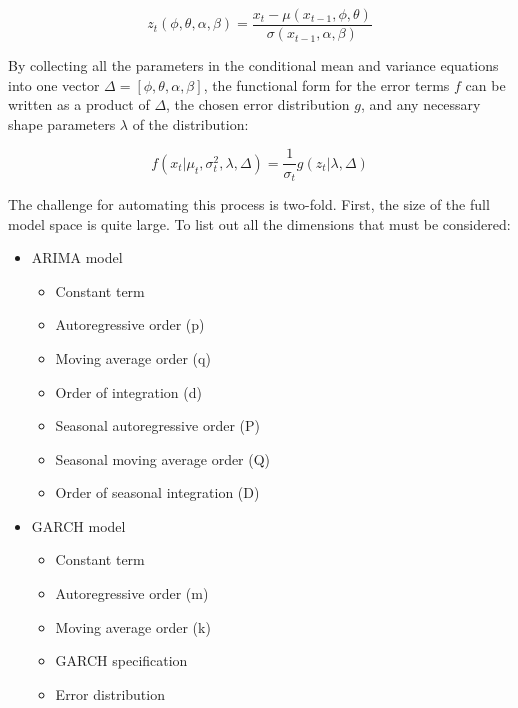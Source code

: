 \documentclass[12pt]{article}
\begin{document}
\begin{equation}
    z_{t}(\phi, \theta, \alpha, \beta) = \frac{x_{t} - \mu(x_{t-1}, \phi, \theta)}{\sigma(x_{t-1}, \alpha, \beta)}
\end{equation}

By collecting all the parameters in the conditional mean and variance equations into one vector $\Delta = [\phi, \theta, \alpha, \beta]$, the functional form for the error terms $f$ can be written as a product of $\Delta$, the chosen error distribution $g$, and any necessary shape parameters $\lambda$ of the distribution:

\begin{equation}
    f(x_{t} | \mu_{t}, \sigma^{2}_{t}, \lambda, \Delta) = \frac{1}{\sigma_{t}} g(z_{t} | \lambda, \Delta)
\end{equation}

The challenge for automating this process is two-fold. First, the size of the full model space is quite large. To list out all the dimensions that must be considered:

\begin{itemize}
    \item ARIMA model
        \begin{itemize}
            \item Constant term
            \item Autoregressive order (p)
            \item Moving average order (q)
            \item Order of integration (d)
            \item Seasonal autoregressive order (P)
            \item Seasonal moving average order (Q)
            \item Order of seasonal integration (D)
        \end{itemize}
        \item GARCH model
        \begin{itemize}
            \item Constant term
            \item Autoregressive order (m)
            \item Moving average order (k)
            \item GARCH specification
            \item Error distribution
        \end{itemize}

\end{itemize}
\end{document}
